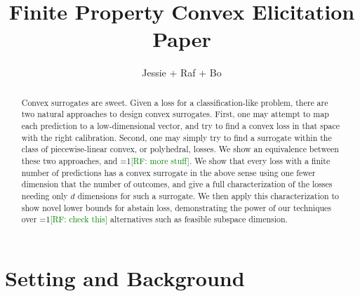 \documentclass[11pt]{colt2019}
\title{Finite Property Convex Elicitation Paper}
\author{Jessie + Raf + Bo}
\newcommand{\Comments}{1}
\newcommand{\mynote}[2]{\ifnum\Comments=1\textcolor{#1}{#2}\fi}
\newcommand{\raf}[1]{\mynote{green}{[RF: #1]}}
\begin{document}
\maketitle

\begin{abstract}
  Convex surrogates are sweet.
  Given a loss for a classification-like problem, there are two natural approaches to design convex surrogates.
  First, one may attempt to map each prediction to a low-dimensional vector, and try to find a convex loss in that space with the right calibration.
  Second, one may simply try to find a surrogate within the class of piecewise-linear convex, or polyhedral, losses.
  We show an equivalence between these two approaches, and \raf{more stuff}.
  We show that every loss with a finite number of predictions has a convex surrogate in the above sense using one fewer dimension that the number of outcomes, and give a full characterization of the losses needing only $d$ dimensions for such a surrogate.
  We then apply this characterization to show novel lower bounds for abstain loss, demonstrating the power of our techniques over \raf{check this} alternatives such as feasible subspace dimension.
\end{abstract}

\section{Setting and Background}
\end{document}
